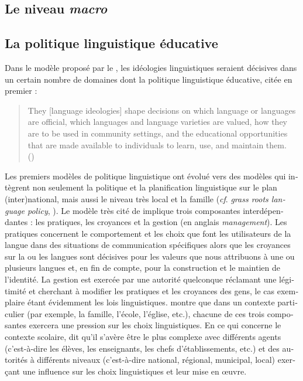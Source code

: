 \documentclass[french, output=paper]{langscibook}
\begin{document}
\begin{otherlanguage}{french}
\section{Le niveau \textit{macro}}\label{sec:granfeldt:3}

\subsection{La politique linguistique éducative}\label{sec:granfeldt:3.1}

Dans le modèle proposé par le \citet{TheDouglasFirgroup2016}, les idéologies linguistiques seraient décisives dans un certain nombre de domaines dont la politique linguistique éducative,  citée en premier : 

\begin{otherlanguage}{english}
\begin{quote}\sloppy
They [language ideologies] shape decisions on which language or languages are official, which languages and language varieties are valued, how they are to be used in community settings, and the educational opportunities that are made available to individuals to learn, use, and maintain them.\\\hbox{}\hfill\hbox{(\citealt[24]{TheDouglasFirgroup2016})}
\end{quote}
\end{otherlanguage}

Les premiers modèles de politique linguistique ont évolué vers des modèles qui intègrent non seulement la politique et la planification linguistique sur le plan (inter)national, mais aussi le niveau très local et la famille (\textit{cf}. \textit{grass roots language policy}, \citealt{SpolskyLambert2006}). Le modèle très cité de \citet{Spolsky2004} implique trois composantes interdépendantes : les pratiques, les croyances et la gestion (en anglais \textit{management}). Les pratiques concernent le comportement et les choix que font les utilisateurs de la langue dans des situations de communication spécifiques alors que les croyances sur la ou les langues sont décisives pour les valeurs que nous attribuons à une ou plusieurs langues et, en fin de compte, pour la construction et le maintien de l'identité. La gestion est exercée par une autorité quelconque réclamant une légitimité et cherchant à modifier les pratiques et les croyances des gens, le cas exemplaire étant évidemment les lois linguistiques. \citet{Spolsky2007} montre que dans un contexte particulier (par exemple, la famille, l'école, l'église, etc.), chacune de ces trois composantes exercera une pression sur les choix linguistiques. En ce qui concerne le contexte scolaire, \citet{Spolsky2007} dit qu'il s'avère être le plus complexe avec différents agents (c'est-à-dire les élèves, les enseignants, les chefs d'établissements, etc.) et des autorités à différents niveaux (c'est-à-dire national, régional, municipal, local) exerçant une influence sur les choix linguistiques et leur mise en œuvre. 


\end{otherlanguage}
\end{document}
